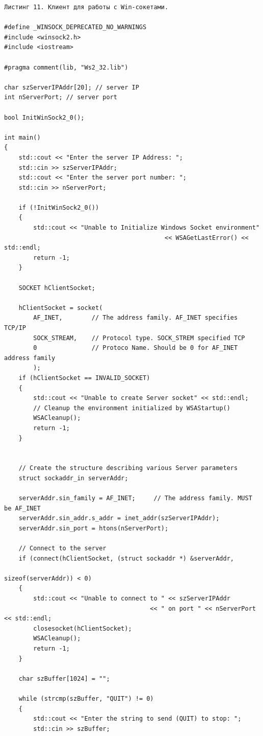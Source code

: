 \documentclass[a4paper,12pt]{article} %
\begin{document}
\begin{verbatim}
Листинг 11. Клиент для работы с Win-сокетами.

#define _WINSOCK_DEPRECATED_NO_WARNINGS
#include <winsock2.h>
#include <iostream>

#pragma comment(lib, "Ws2_32.lib")

char szServerIPAddr[20]; // server IP
int nServerPort; // server port

bool InitWinSock2_0();

int main()
{
    std::cout << "Enter the server IP Address: ";
    std::cin >> szServerIPAddr;
    std::cout << "Enter the server port number: ";
    std::cin >> nServerPort;

    if (!InitWinSock2_0())
    {
        std::cout << "Unable to Initialize Windows Socket environment"
                                            << WSAGetLastError() << std::endl;
        return -1;
    }

    SOCKET hClientSocket;

    hClientSocket = socket(
        AF_INET,        // The address family. AF_INET specifies TCP/IP
        SOCK_STREAM,    // Protocol type. SOCK_STREM specified TCP
        0               // Protoco Name. Should be 0 for AF_INET address family
        );
    if (hClientSocket == INVALID_SOCKET)
    {
        std::cout << "Unable to create Server socket" << std::endl;
        // Cleanup the environment initialized by WSAStartup()
        WSACleanup();
        return -1;
    }


    // Create the structure describing various Server parameters
    struct sockaddr_in serverAddr;

    serverAddr.sin_family = AF_INET;     // The address family. MUST be AF_INET
    serverAddr.sin_addr.s_addr = inet_addr(szServerIPAddr);
    serverAddr.sin_port = htons(nServerPort);

    // Connect to the server
    if (connect(hClientSocket, (struct sockaddr *) &serverAddr,
                                                        sizeof(serverAddr)) < 0)
    {
        std::cout << "Unable to connect to " << szServerIPAddr
                                        << " on port " << nServerPort << std::endl;
        closesocket(hClientSocket);
        WSACleanup();
        return -1;
    }

    char szBuffer[1024] = "";

    while (strcmp(szBuffer, "QUIT") != 0)
    {
        std::cout << "Enter the string to send (QUIT) to stop: ";
        std::cin >> szBuffer;


\end{verbatim}
\end{document}
